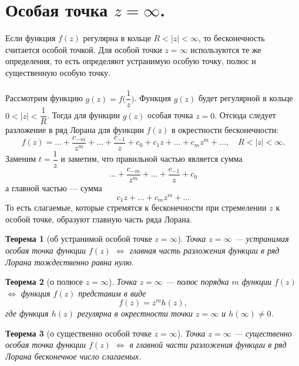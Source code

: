 \documentclass[a4paper, 12pt]{article}
\newtheorem*{theorem}{Теорема}
\begin{document}
\section{Особая точка $z = \infty$.}
Если функция $f(z)$ регулярна в кольце $R < |z| < \infty$, то бесконечность считается особой точкой. Для особой точки $z = \infty$ используются те же определения, то есть определяют устранимую особую точку, полюс и существенную особую точку.\\\\
Рассмотрим функцию $g(z) = f\Big(\dfrac{1}{z}\Big)$. Функция $g(z)$ будет регулярной в кольце $0< | z| <\dfrac{1}{R}$. Тогда для функции $g(z)$ особая точка $z = 0$. Отсюда следует разложение в ряд Лорана для функции $f(z)$ в окрестности бесконечности:
$$f(z) = \ldots + \dfrac{c_{-m}}{z^m} +\ldots + \dfrac{c_{-1}}{z} + c_0 + c_1z + \ldots + c_mz^m + \ldots,\quad R < |z| < \infty.$$
Заменим $t = \dfrac{1}{z}$ и заметим, что правильной частью является сумма $$\ldots + \dfrac{c_{-m}}{z^m} +\ldots + \dfrac{c_{-1}}{z} + c_0$$
а главной частью --- сумма $$c_1z + \ldots + c_mz^m + \ldots$$
То есть слагаемые, которые стремятся к бесконечности при стремелении $z$ к особой точке, образуют главную часть ряда Лорана.\begin{theorem}
	[об устранимой особой точке $z = \infty$] Точка $z = \infty$ --- устранимая особая точка функции $f(z)$ $\Longleftrightarrow$ главная часть разложения функции в ряд Лорана тождественно равна нулю.
\end{theorem}
\begin{theorem}
	[о полюсе $z = \infty$] Точка $z = \infty$ --- полюс порядка $m$ функции $f(z)$ $\Longleftrightarrow$ функция $f(z)$ представим в виде $$f(z) = z^m h(z),$$ где функция $h(z)$ регулярна в окрестности точки $z = \infty$ и $h(\infty) \ne 0$.
\end{theorem}
\begin{theorem}
	[о существенно особой точке $z = \infty$] Точка $z = \infty$ --- существенно особая точка функции $f(z)$ $\Longleftrightarrow$ в главной части разложения функции в ряд Лорана бесконечное число слагаемых.
\end{theorem}
\end{document}
